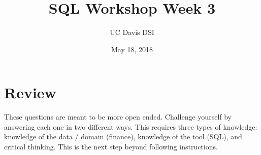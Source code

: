 \documentclass[10pt]{exam}
\begin{document}
 
\title{SQL Workshop Week 3}
\author{UC Davis DSI}
\date{May 18, 2018}

\maketitle

\section{Review}

    These questions are meant to be more open ended. Challenge yourself by
    answering each one in two different ways. This requires three types of
    knowledge: knowledge of the data / domain (finance), knowledge of the
    tool (SQL), and critical thinking. This is the next step beyond following
    instructions.
\end{document}
